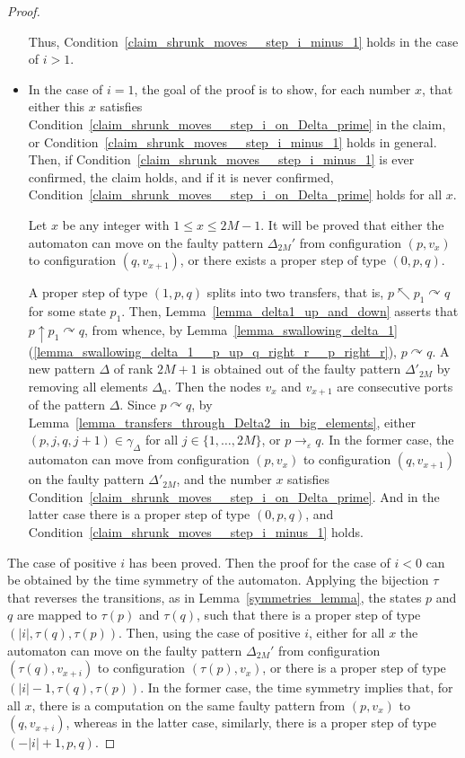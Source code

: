 \documentclass[12pt,a4paper]{article}
\theoremstyle{definition}
\renewcommand{\epsilon}{\varepsilon}
\begin{document}
\begin{proof}
\begin{itemize}
	Thus, Condition~\ref{claim_shrunk_moves__step_i_minus_1}
	holds in the case of $i > 1$.
\item
	In the case of $i = 1$,
	the goal of the proof is to show, for each number $x$,
	that either this $x$ satisfies Condition~\ref{claim_shrunk_moves__step_i_on_Delta_prime} 
	in the claim,
	or Condition~\ref{claim_shrunk_moves__step_i_minus_1} holds in general.
	Then, if Condition~\ref{claim_shrunk_moves__step_i_minus_1} is ever confirmed,
	the claim holds,
	and if it is never confirmed,
	Condition~\ref{claim_shrunk_moves__step_i_on_Delta_prime} holds for all $x$.
	
	Let $x$ be any integer with $1 \leqslant x \leqslant 2M-1$.
	It will be proved that either the automaton can move 
	on the faulty pattern $\Delta_{2M}'$ from configuration $(p,v_x)$ to configuration $(q,v_{x+1})$,
	or there exists a proper step of type $(0,p,q)$.
	
	A proper step of type $(1,p,q)$ splits into two transfers,
	that is, $p \nwarrow p_1 \curvearrowright q$ for some state $p_1$.
	Then, Lemma~\ref{lemma_delta1_up_and_down} asserts 
	that $p \uparrow p_1 \curvearrowright q$,
	from whence, by Lemma~\ref{lemma_swallowing_delta_1}(\ref{lemma_swallowing_delta_1__p_up_q_right_r__p_right_r}), $p \curvearrowright q$.
	A new pattern $\Delta$ of rank $2M+1$ is obtained out of the faulty pattern $\Delta'_{2M}$
	by removing all elements $\Delta_a$.
	Then the nodes $v_x$ and $v_{x+1}$ are consecutive ports
	of the pattern $\Delta$.
	Since $p \curvearrowright q$,
	by Lemma~\ref{lemma_transfers_through_Delta2_in_big_elements},
	either $(p,j,q,j+1)\in \gamma_\Delta$ for all $j \in \{1, \ldots, 2M\}$,
	or $p \to_\epsilon q$.
	In the former case, the automaton can move from configuration $(p,v_x)$
	to configuration $(q,v_{x+1})$ on the faulty pattern $\Delta'_{2M}$,
	and the number $x$ satisfies Condition~\ref{claim_shrunk_moves__step_i_on_Delta_prime}.
	And in the latter case there is a proper step of type $(0,p,q)$,
	and Condition~\ref{claim_shrunk_moves__step_i_minus_1} holds.
\end{itemize}

The case of positive $i$ has been proved.
Then the proof for the case of $i < 0$ can be obtained by the time symmetry of the automaton.
Applying the bijection $\tau$ that reverses the transitions,
as in Lemma~\ref{symmetries_lemma},
the states $p$ and $q$ are mapped to $\tau(p)$ and $\tau(q)$,
such that there is a proper step of type $(|i|,\tau(q),\tau(p))$.
Then, using the case of positive $i$,
either for all $x$ the automaton can move on the faulty pattern $\Delta_{2M}'$
from configuration $(\tau(q),v_{x+i})$ to configuration $(\tau(p),v_x)$,
or there is a proper step of type $(|i|-1,\tau(q),\tau(p))$.
In the former case, the time symmetry implies that, for all $x$,
there is a computation on the same faulty pattern from $(p,v_x)$ to $(q,v_{x+i})$,
whereas in the latter case, similarly, there is a proper step of type $(-|i|+1,p,q)$.
\end{proof}
\end{document}
